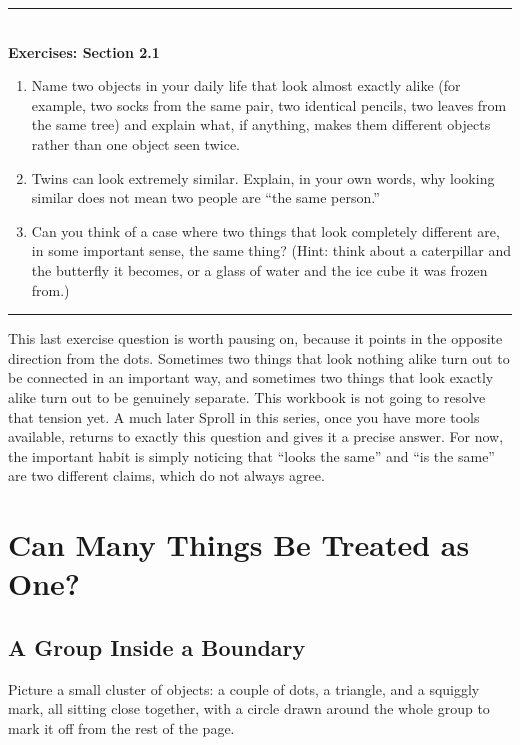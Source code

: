 \documentclass[11pt]{book}
\newenvironment{exercisebox}[1]{%
\vspace{0.8em}\noindent\rule{\linewidth}{0.6pt}\\[0.2em]\textbf{Exercises: #1}\\[0.3em]%
\begin{enumerate}[label=\arabic*., itemsep=0.4em]}%
{\end{enumerate}\noindent\rule{\linewidth}{0.6pt}\vspace{0.6em}}
\begin{document}
\begin{exercisebox}{Section 2.1}
\item Name two objects in your daily life that look almost exactly alike (for example, two socks from the same pair, two identical pencils, two leaves from the same tree) and explain what, if anything, makes them different objects rather than one object seen twice.
\item Twins can look extremely similar. Explain, in your own words, why looking similar does not mean two people are ``the same person.''
\item Can you think of a case where two things that look completely different are, in some important sense, the same thing? (Hint: think about a caterpillar and the butterfly it becomes, or a glass of water and the ice cube it was frozen from.)
\end{exercisebox}

This last exercise question is worth pausing on, because it points in the opposite direction from the dots. Sometimes two things that look nothing alike turn out to be connected in an important way, and sometimes two things that look exactly alike turn out to be genuinely separate. This workbook is not going to resolve that tension yet. A much later Sproll in this series, once you have more tools available, returns to exactly this question and gives it a precise answer. For now, the important habit is simply noticing that ``looks the same'' and ``is the same'' are two different claims, which do not always agree.

\chapter{Can Many Things Be Treated as One?}

\section{A Group Inside a Boundary}

Picture a small cluster of objects: a couple of dots, a triangle, and a squiggly mark, all sitting close together, with a circle drawn around the whole group to mark it off from the rest of the page.

\begin{center}
\end{center}
\end{document}
